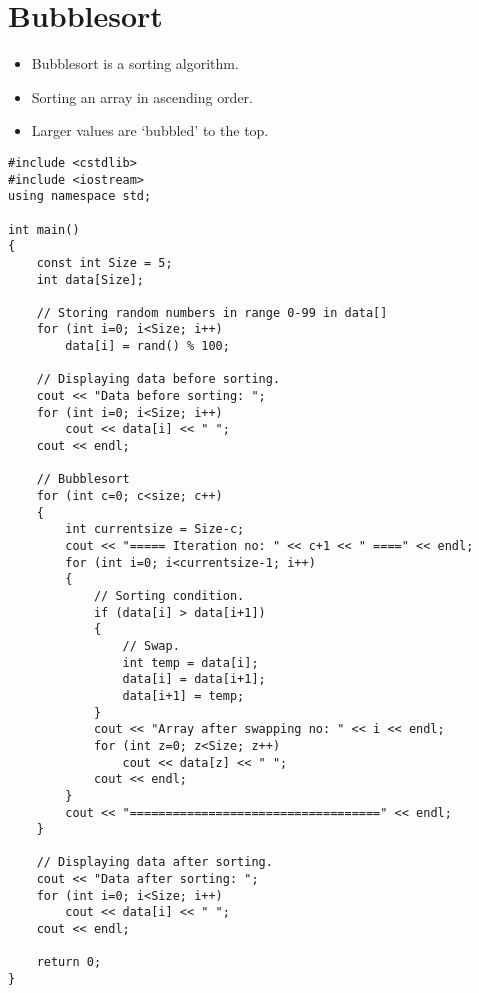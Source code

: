 \documentclass[12pt,a4paper]{article}
\begin{document}
\section{Bubblesort}
\begin{itemize}
\item Bubblesort is a sorting algorithm.
\item Sorting an array in ascending order.
\item Larger values are `bubbled' to the top.
\end{itemize}
\begin{lstlisting}[caption={Bubble Sort}]
#include <cstdlib>
#include <iostream>
using namespace std;

int main()
{
	const int Size = 5;
	int data[Size];

	// Storing random numbers in range 0-99 in data[]
	for (int i=0; i<Size; i++)
		data[i] = rand() % 100;
		
	// Displaying data before sorting.
	cout << "Data before sorting: ";
	for (int i=0; i<Size; i++)
		cout << data[i] << " ";
	cout << endl;

	// Bubblesort
	for (int c=0; c<size; c++)
	{
		int currentsize = Size-c;
		cout << "===== Iteration no: " << c+1 << " ====" << endl;
		for (int i=0; i<currentsize-1; i++)
		{
			// Sorting condition.
			if (data[i] > data[i+1])
			{
				// Swap.
				int temp = data[i];
				data[i] = data[i+1];
				data[i+1] = temp;
			}
			cout << "Array after swapping no: " << i << endl;
			for (int z=0; z<Size; z++)
				cout << data[z] << " ";
			cout << endl;
		}
		cout << "===================================" << endl;
	}

	// Displaying data after sorting.
	cout << "Data after sorting: ";
	for (int i=0; i<Size; i++)
		cout << data[i] << " ";
	cout << endl;
	
	return 0;
}
\end{lstlisting}
\end{document}
